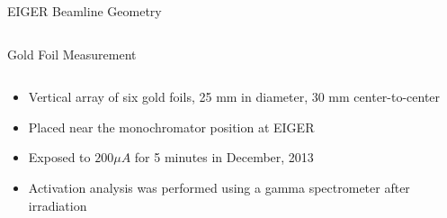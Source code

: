 \documentclass[final,t]{beamer}
\begin{document}
\begin{frame}{}
\begin{columns}[t]
\begin{column}{.3\linewidth}
\begin{block}{EIGER Beamline Geometry}
\begin{columns}[T]
\begin{column}{.25\linewidth}
        \end{column}
      \end{columns}
      
      \end{block}


      \begin{block}{Gold Foil Measurement}
        \begin{columns}[T]
          \begin{column}{.65\linewidth}
          \begin{itemize} 
          \item Vertical array of six gold foils, 25 mm in diameter, 30 mm center-to-center
          \item Placed near the monochromator position at EIGER
          \item Exposed to $200 \mu A$ for 5 minutes in December, 2013
          \item Activation analysis was performed using a gamma spectrometer after irradiation
          \end{itemize}


\end{column}
\end{columns}
\end{block}
\end{column}
\end{columns}
\end{frame}
\end{document}
